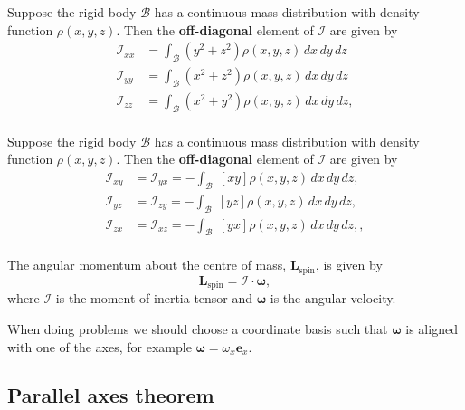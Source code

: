 \documentclass[12pt, a4paper]{article}
\begin{document}
\begin{proposition}
    Suppose the rigid body \(\mathcal{B}\) has a continuous mass distribution with density function \(\rho(x,y,z)\). Then the \textbf{off-diagonal} element of \(\mathcal{I}\) are given by
    \[\begin{aligned}
        \mathcal{I}_{xx} &= \int_{\mathcal{B}} \left( y^2+z^2 \right) \rho(x,y,z) \, dx \, dy \, dz \\
        \mathcal{I}_{yy} &= \int_{\mathcal{B}} \left( x^2+z^2 \right) \rho(x,y,z) \, dx \, dy \, dz \\
        \mathcal{I}_{zz} &= \int_{\mathcal{B}} \left( x^2+y^2 \right) \rho(x,y,z) \, dx \, dy \, dz, \\
    \end{aligned}\]
\end{proposition}

\begin{proposition}
    Suppose the rigid body \(\mathcal{B}\) has a continuous mass distribution with density function \(\rho(x,y,z)\). Then the \textbf{off-diagonal} element of \(\mathcal{I}\) are given by
    \[\begin{aligned}
        \mathcal{I}_{xy} &= \mathcal{I}_{yx} = - \int_{\mathcal{B}} \; [xy] \rho(x,y,z) \, dx \, dy \, dz, \\
        \mathcal{I}_{yz} &= \mathcal{I}_{zy} = - \int_{\mathcal{B}} \; [yz] \rho(x,y,z) \, dx \, dy \, dz, \\
        \mathcal{I}_{zx} &= \mathcal{I}_{xz} = - \int_{\mathcal{B}} \; [yx] \rho(x,y,z) \, dx \, dy \, dz, , \\
    \end{aligned}\]
\end{proposition}

\begin{mdthm}
    The angular momentum about the centre of mass, \(\bm{L}_{\text{spin}}\), is given by
    \[\bm{L}_{\text{spin}} = \mathcal{I} \cdot \bm{\omega},\]
    where \(\mathcal{I}\) is the moment of inertia tensor and \(\bm{\omega}\) is the angular velocity.
\end{mdthm}

\begin{mdnote}
    When doing problems we should choose a coordinate basis such that \(\bm{\omega}\) is aligned with one of the axes, for example \(\bm{\omega} = \omega_x \bm{e}_x\).
\end{mdnote}

\subsection{Parallel axes theorem}
\end{document}
